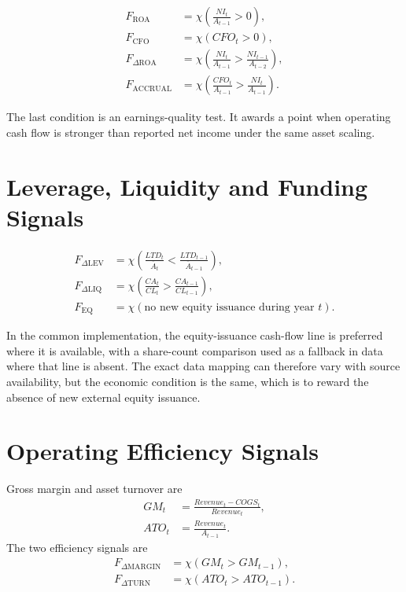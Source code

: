 \documentclass[11pt,a4paper]{report}
\numberwithin{figure}{chapter}
\numberwithin{table}{chapter}
\numberwithin{equation}{chapter}
\begin{document}
\begin{align}
F_{\mathrm{ROA}} &= \chi\left(\frac{NI_t}{A_{t-1}}>0\right),\\
F_{\mathrm{CFO}} &= \chi\left(CFO_t>0\right),\\
F_{\Delta \mathrm{ROA}} &= \chi\left(\frac{NI_t}{A_{t-1}}>\frac{NI_{t-1}}{A_{t-2}}\right),\\
F_{\mathrm{ACCRUAL}} &= \chi\left(\frac{CFO_t}{A_{t-1}}>\frac{NI_t}{A_{t-1}}\right).
\end{align}

The last condition is an earnings-quality test. It awards a point when operating cash flow is stronger than reported net income under the same asset scaling.

\section{Leverage, Liquidity and Funding Signals}

\begin{align}
F_{\Delta \mathrm{LEV}} &= \chi\left(\frac{LTD_t}{\overline{A}_t}<\frac{LTD_{t-1}}{\overline{A}_{t-1}}\right),\\
F_{\Delta \mathrm{LIQ}} &= \chi\left(\frac{CA_t}{CL_t}>\frac{CA_{t-1}}{CL_{t-1}}\right),\\
F_{\mathrm{EQ}} &= \chi\left(\text{no new equity issuance during year }t\right).
\end{align}

In the common implementation, the equity-issuance cash-flow line is preferred where it is available, with a share-count comparison used as a fallback in data where that line is absent. The exact data mapping can therefore vary with source availability, but the economic condition is the same, which is to reward the absence of new external equity issuance.

\section{Operating Efficiency Signals}

Gross margin and asset turnover are
\begin{align}
GM_t &= \frac{Revenue_t-COGS_t}{Revenue_t},\\
ATO_t &= \frac{Revenue_t}{A_{t-1}}.
\end{align}
The two efficiency signals are
\begin{align}
F_{\Delta \mathrm{MARGIN}} &= \chi\left(GM_t>GM_{t-1}\right),\\
F_{\Delta \mathrm{TURN}} &= \chi\left(ATO_t>ATO_{t-1}\right).
\end{align}
\end{document}

